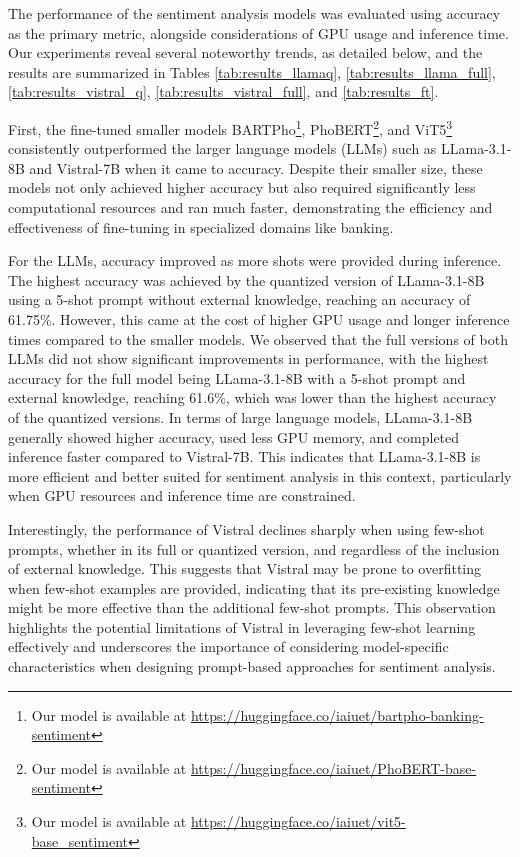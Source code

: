 {The performance of the sentiment analysis models was evaluated using accuracy as the primary metric, alongside considerations of GPU usage and inference time. Our experiments reveal several noteworthy trends, as detailed below, and the results are summarized in Tables \ref{tab:results_llamaq}, \ref{tab:results_llama_full}, \ref{tab:results_vistral_q}, \ref{tab:results_vistral_full}, and \ref{tab:results_ft}.

First, the fine-tuned smaller models BARTPho\footnote{Our model is available at \url{https://huggingface.co/iaiuet/bartpho-banking-sentiment}}, PhoBERT\footnote{Our model is available at \url{https://huggingface.co/iaiuet/PhoBERT-base-sentiment}}, and ViT5\footnote{Our model is available at \url{https://huggingface.co/iaiuet/vit5-base_sentiment}} consistently outperformed the larger language models (LLMs) such as LLama-3.1-8B and Vistral-7B when it came to accuracy. Despite their smaller size, these models not only achieved higher accuracy but also required significantly less computational resources and ran much faster, demonstrating the efficiency and effectiveness of fine-tuning in specialized domains like banking.

For the LLMs, accuracy improved as more shots were provided during inference. The highest accuracy was achieved by the quantized version of LLama-3.1-8B using a 5-shot prompt without external knowledge, reaching an accuracy of 61.75\%. However, this came at the cost of higher GPU usage and longer inference times compared to the smaller models. We observed that the full versions of both LLMs did not show significant improvements in performance, with the highest accuracy for the full model being LLama-3.1-8B with a 5-shot prompt and external knowledge, reaching 61.6\%, which was lower than the highest accuracy of the quantized versions. In terms of large language models, LLama-3.1-8B generally showed higher accuracy, used less GPU memory, and completed inference faster compared to Vistral-7B. This indicates that LLama-3.1-8B is more efficient and better suited for sentiment analysis in this context, particularly when GPU resources and inference time are constrained.

Interestingly, the performance of Vistral declines sharply when using few-shot prompts, whether in its full or quantized version, and regardless of the inclusion of external knowledge. This suggests that Vistral may be prone to overfitting when few-shot examples are provided, indicating that its pre-existing knowledge might be more effective than the additional few-shot prompts. This observation highlights the potential limitations of Vistral in leveraging few-shot learning effectively and underscores the importance of considering model-specific characteristics when designing prompt-based approaches for sentiment analysis.

}
